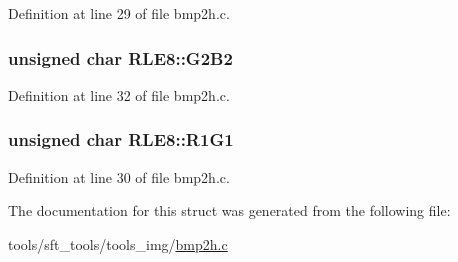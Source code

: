 Definition at line 29 of file bmp2h.c.

\hypertarget{structRLE8_a1932057611d13046604349803f79c623}{
\subsubsection[{G2B2}]{\setlength{\rightskip}{0pt plus 5cm}unsigned char {\bf RLE8::G2B2}}}
\label{structRLE8_a1932057611d13046604349803f79c623}


Definition at line 32 of file bmp2h.c.

\hypertarget{structRLE8_ad09dcc9b98767770301b2ca22bf70887}{
\subsubsection[{R1G1}]{\setlength{\rightskip}{0pt plus 5cm}unsigned char {\bf RLE8::R1G1}}}
\label{structRLE8_ad09dcc9b98767770301b2ca22bf70887}


Definition at line 30 of file bmp2h.c.



The documentation for this struct was generated from the following file:\begin{DoxyCompactItemize}
\item 
tools/sft\_\-tools/tools\_\-img/\hyperlink{bmp2h_8c}{bmp2h.c}\end{DoxyCompactItemize}
